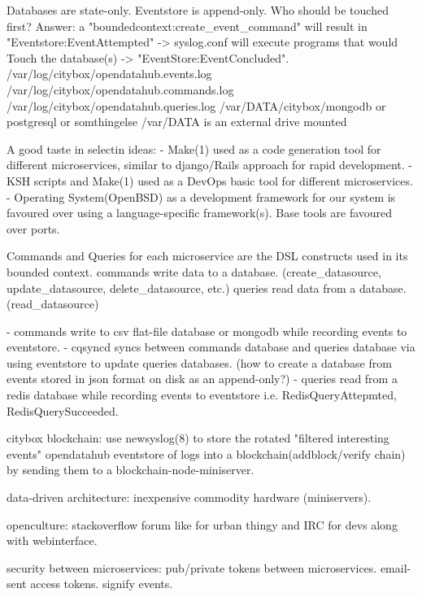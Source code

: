 Databases are state-only. 
Eventstore is append-only. 
Who should be touched first?
Answer: a "boundedcontext:create_event_command" will result in 
"Eventstore:EventAttempted" -> syslog.conf will execute programs that would Touch the database(s) -> "EventStore:EventConcluded".
/var/log/citybox/opendatahub.events.log
/var/log/citybox/opendatahub.commands.log
/var/log/citybox/opendatahub.queries.log
/var/DATA/citybox/mongodb or postgresql or somthingelse
/var/DATA is an external drive mounted

A good taste in selectin ideas:
- Make(1) used as a code generation tool for different microservices, similar to django/Rails approach for rapid development. 
- KSH scripts and Make(1) used as a DevOps basic tool for different microservices.
- Operating System(OpenBSD) as a development framework for our system is favoured over using a language-specific framework(s). Base tools are favoured over ports. 

Commands and Queries for each microservice are the DSL constructs used in its bounded context.
commands write data to a database. (create_datasource, update_datasource, delete_datasource, etc.)
queries read data from a database. (read_datasource)

- commands write to csv flat-file database or mongodb while recording events to eventstore.
- cqsyncd syncs between commands database and queries database via using eventstore to update queries databases. (how to create a database from events stored in json format on disk as an append-only?)
- queries read from a redis database while recording events to eventstore i.e. RedisQueryAttepmted, RedisQuerySucceeded.

citybox blockchain: use newsyslog(8) to store the rotated "filtered interesting events" opendatahub eventstore of logs into a blockchain(addblock/verify chain) by sending them to a blockchain-node-miniserver.

data-driven architecture: inexpensive commodity hardware (miniservers).

openculture: stackoverflow forum like for urban thingy and IRC for devs along with webinterface.

security between microservices: 
pub/private tokens between microservices.
email-sent access tokens.
signify events.

